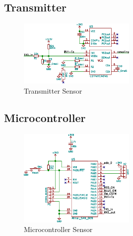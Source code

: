 
\subsection{Transmitter}
\label{subsec:hw:sensor:transmitter}

\begin{figure}[h!t]
    \centering
    \includegraphics[width=0.5\textwidth]{images/sensor-sch/sensor--sch--transmitter.eps}
    \caption[Sensor: Schema Transmitter]{Transmitter Sensor}
\end{figure}



\subsection{Microcontroller}
\label{subsec:hw:sensor:mcu}

\begin{figure}[h!t]
    \centering
    \includegraphics[width=0.5\textwidth]{images/sensor-sch/sensor--sch--mcu.eps}
    \caption[Sensor: Schema Microcontroller]{Microcontroller Sensor}
\end{figure}

